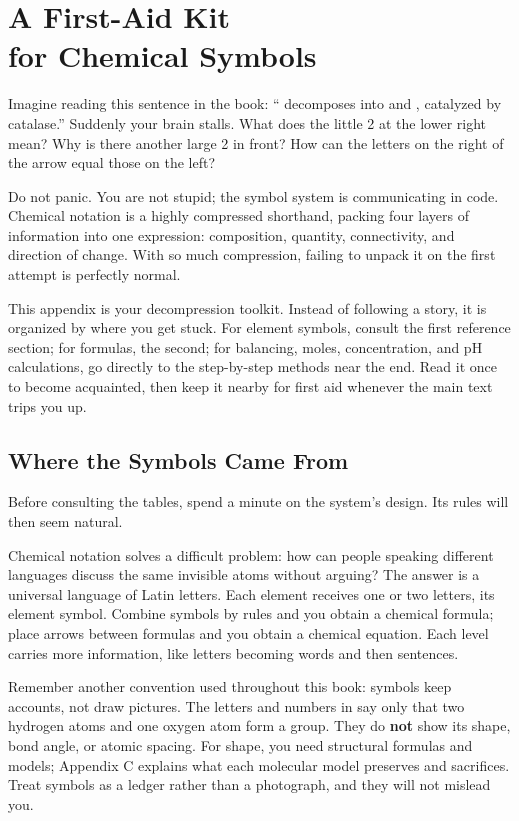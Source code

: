 \chapter[A First-Aid Kit for Chemical Symbols]{A First-Aid Kit\protect\\ for Chemical Symbols}

\begin{kaichang}
Imagine reading this sentence in the book: `` decomposes into  and , catalyzed by catalase.'' Suddenly your brain stalls. What does the little 2 at the lower right mean? Why is there another large 2 in front? How can the letters on the right of the arrow equal those on the left?

Do not panic. You are not stupid; the symbol system is communicating in code. Chemical notation is a highly compressed shorthand, packing four layers of information into one expression: composition, quantity, connectivity, and direction of change. With so much compression, failing to unpack it on the first attempt is perfectly normal.

This appendix is your decompression toolkit. Instead of following a story, it is organized by where you get stuck. For element symbols, consult the first reference section; for formulas, the second; for balancing, moles, concentration, and pH calculations, go directly to the step-by-step methods near the end. Read it once to become acquainted, then keep it nearby for first aid whenever the main text trips you up.
\end{kaichang}

\section{Where the Symbols Came From}

Before consulting the tables, spend a minute on the system's design. Its rules will then seem natural.

Chemical notation solves a difficult problem: how can people speaking different languages discuss the same invisible atoms without arguing? The answer is a universal language of Latin letters. Each element receives one or two letters, its element symbol. Combine symbols by rules and you obtain a chemical formula; place arrows between formulas and you obtain a chemical equation. Each level carries more information, like letters becoming words and then sentences.

Remember another convention used throughout this book: symbols keep accounts, not draw pictures. The letters and numbers in  say only that two hydrogen atoms and one oxygen atom form a group. They do \textbf{not} show its shape, bond angle, or atomic spacing. For shape, you need structural formulas and models; Appendix C explains what each molecular model preserves and sacrifices. Treat symbols as a ledger rather than a photograph, and they will not mislead you.

